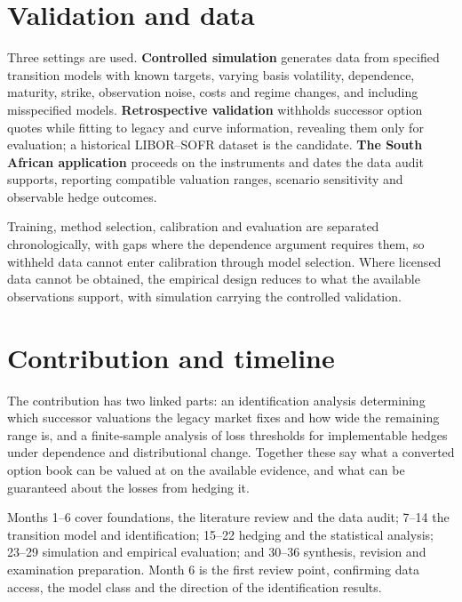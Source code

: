 \documentclass[12pt,final]{article}
\begin{document}
	\section{Validation and data}

	Three settings are used. \textbf{Controlled simulation} generates data from
	specified transition models with known targets, varying basis volatility,
	dependence, maturity, strike, observation noise, costs and regime changes, and
	including misspecified models. \textbf{Retrospective validation} withholds
	successor option quotes while fitting to legacy and curve information,
	revealing them only for evaluation; a historical LIBOR--SOFR dataset is the
	candidate. \textbf{The South African application} proceeds on the instruments
	and dates the data audit supports, reporting compatible valuation ranges,
	scenario sensitivity and observable hedge outcomes.

	Training, method selection, calibration and evaluation are separated
	chronologically, with gaps where the dependence argument requires them, so
	withheld data cannot enter calibration through model selection. Where licensed
	data cannot be obtained, the empirical design reduces to what the available
	observations support, with simulation carrying the controlled validation.

	\section{Contribution and timeline}

	The contribution has two linked parts: an identification analysis determining
	which successor valuations the legacy market fixes and how wide the remaining
	range is, and a finite-sample analysis of loss thresholds for implementable
	hedges under dependence and distributional change. Together these say what a
	converted option book can be valued at on the available evidence, and what can
	be guaranteed about the losses from hedging it.

	Months 1--6 cover foundations, the literature review and the data audit;
	7--14 the transition model and identification; 15--22 hedging and the
	statistical analysis; 23--29 simulation and empirical evaluation; and 30--36
	synthesis, revision and examination preparation. Month 6 is the first review
	point, confirming data access, the model class and the direction of the
	identification results.

	\clearpage
	\nocite{sarb2024conv}
	
	
\end{document}
